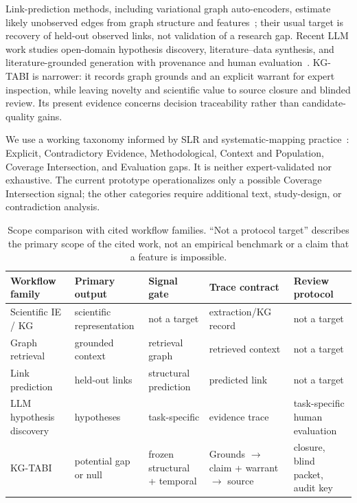 \documentclass[runningheads]{llncs}
\begin{document}
Link-prediction methods, including variational graph auto-encoders, estimate likely unobserved edges from graph structure and features~\cite{kipf2016vgae}; their usual target is recovery of held-out observed links, not validation of a research gap. Recent LLM work studies open-domain hypothesis discovery, literature--data synthesis, and literature-grounded generation with provenance and human evaluation~\cite{yang2023moose,liu2025literature,vasu2025hyper}. KG-TABI is narrower: it records graph grounds and an explicit warrant for expert inspection, while leaving novelty and scientific value to source closure and blinded review. Its present evidence concerns decision traceability rather than candidate-quality gains.

We use a working taxonomy informed by SLR and systematic-mapping practice~\cite{kitchenham2007guidelines,petersen2015guidelines}: Explicit, Contradictory Evidence, Methodological, Context and Population, Coverage Intersection, and Evaluation gaps. It is neither expert-validated nor exhaustive. The current prototype operationalizes only a possible Coverage Intersection signal; the other categories require additional text, study-design, or contradiction analysis.

\begin{table}[t]
\caption{Scope comparison with cited workflow families. ``Not a protocol target'' describes the primary scope of the cited work, not an empirical benchmark or a claim that a feature is impossible.}
\label{tab:workflow-comparison}
\centering\scriptsize
\begin{tabular}{p{2.1cm}p{2.1cm}p{1.75cm}p{2.05cm}p{2.05cm}}
\toprule
Workflow family & Primary output & Signal gate & Trace contract & Review protocol\\
\midrule
Scientific IE / KG~\cite{luan2018information,jaradeh2019open} & scientific representation & not a target & extraction/KG record & not a target\\
Graph retrieval~\cite{edge2024graphrag,guo2024lightrag,gutierrez2024hipporag} & grounded context & retrieval graph & retrieved context & not a target\\
Link prediction~\cite{kipf2016vgae} & held-out links & structural prediction & predicted link & not a target\\
LLM hypothesis discovery~\cite{yang2023moose,liu2025literature,vasu2025hyper} & hypotheses & task-specific & evidence trace & task-specific human evaluation\\
KG-TABI & potential gap or null & frozen structural + temporal & Grounds $\rightarrow$ claim + warrant $\rightarrow$ source & closure, blind packet, audit key\\
\bottomrule
\end{tabular}
\end{table}
\end{document}

